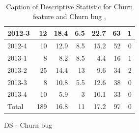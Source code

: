 \documentclass[UKenglish]{ifimaster}  %
\begin{document}
\begin{appendices}
\begin{table}[!htbp]
\begin{adjustwidth}{-1.5cm}{}
\begin{subfigure}[b]{0.3\textwidth}
{\begin{tabular}{ | l | r | r | r | r | r | r | }
 2012-3  & 12 & 18.4 & 6.5 & 22.7 & 63 & 1 \\ \hline
 2012-4  & 10 & 12.9 & 8.5 & 15.2 & 52 & 0\\ \hline
 2013-1  & 8 & 8.2 & 8.5 & 4.4 & 16 & 1 \\ \hline
 2013-2  & 25 & 14.4 & 13 & 9.6 & 34 & 2 \\ \hline
 2013-3  & 8 & 10.8 & 5.5 & 12.6 & 38 & 0\\ \hline
 2013-4  & 10 & 5.9 & 3 & 10.1 & 33 & 0\\ \hline
 Total  & 189 & 16.8 & 11 & 17.2 & 97 & 0\\ \hline\end{tabular}
}
\caption{DS - Churn bug}
\label{DS:CB:1}
\end{subfigure}
\end{adjustwidth}
\caption[Optional caption for list of figures]{Caption of Descriptive Statistic for Churn feature and Churn bug  , }
\label{DS:1:4} %
\end{table}






\end{appendices}
\end{document}
